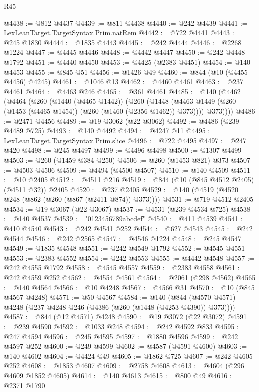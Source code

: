 \begin{lexlean}{R45}
\begin{coremodule}
{@4438 := @812 @4437
@4439 := @811 @4438
@4440 := @242 @4439
@4441 := LexLeanTarget.TargetSyntax.Prim.natRem
@4442 := @722 @4441
@4443 := @245 @1830
@4444 := @1835 @4443
@4445 := @242 @4444
@4446 := @2268 @1224
@4447 := @4445 @4446
@4448 := @4442 @4447
@4450 := @242 @4448 @1792
@4451 := @4440 @4450
@4453 := @4425 (@2383 @4451)
@4454 := @140 @4453
@4455 := @845 @51
@4456 := @1426 @49
@4460 := @844 (@10 (@4455 @4456) @4245)
@4461 := @1046 @13
@4462 := @4460 @4461
@4463 := @237 @4461
@4464 := @4463 @246
@4465 := @361 @4461
@4485 := @140
    (@4462
      (@4464
        (@260
          (@1440 (@4465 @1442))
          (@260
            (@1448 (@4463 @1449 (@260 (@1453 (@4465 @1454)) (@260 (@1460 (@2356 @1462)) @373))))
            @373))))
@4486 := @2471 @4456
@4489 := @19 @3062 (@22 @3062)
@4492 := @4486 (@239 @4489 @725)
@4493 := @140 @4492
@4494 := @4247 @11
@4495 := LexLeanTarget.TargetSyntax.Prim.slice
@4496 := @722 @4495
@4497 := @247 @420
@4498 := @245 @4497
@4499 := @4496 @4498
@4500 := @1307 @4499
@4503 := @260 (@1459 @384 @250)
@4506 := @260 (@1453 @821) @373
@4507 := @4503 @4506
@4509 := @4494 (@4500 @4507)
@4510 := @140 @4509
@4511 := @10 @2405
@4512 := @4511 @216
@4519 := @844 (@10 (@845 @4512 @2405) (@4511 @32)) @2405
@4520 := @237 @2405
@4529 := @140 (@4519 (@4520 @248 (@862 (@260 (@867 (@2411 @874)) @373))))
@4531 := @719 @4512 @2405
@4534 := @19 @3067 (@22 @3067)
@4537 := @4531 (@239 @4534 @725)
@4538 := @140 @4537
@4539 := "0123456789abcdef"
@4540 := @411 @4539
@4541 := @410 @4540
@4543 := @242 @4541 @252
@4544 := @627 @4543
@4545 := @242 @4544
@4546 := @242 @2565
@4547 := @4546 @1224
@4548 := @245 @4547
@4549 := @1835 @4548
@4551 := @242 @4549 @1792
@4552 := @4545 @4551
@4553 := @2383 @4552
@4554 := @242 @4553
@4555 := @4442 @4548
@4557 := @242 @4555 @1792
@4558 := @4545 @4557
@4559 := @2383 @4558
@4561 := @242 @4559 @252
@4562 := @4554 @4561
@4564 := @2061 (@298 @4562)
@4565 := @140 @4564
@4566 := @10 @4248
@4567 := @4566 @31
@4570 := @10 (@845 @4567 @4248)
@4571 := @50 @4567
@4584 := @140 (@844 (@4570 @4571) @4248 (@237 @4248 @246 (@4386 (@260 (@1448 (@4253 @4390)) @373))))
@4587 := @844 (@12 @4571) @4248
@4590 := @19 @3072 (@22 @3072)
@4591 := @239 @4590
@4592 := @1033 @248
@4594 := @242 @4592 @833
@4595 := @247 @4594
@4596 := @245 @4595
@4597 := @1880 @4596
@4599 := @242 @4597 @252
@4600 := @249 @4599
@4602 := @4587 (@4591 @4600)
@4603 := @140 @4602
@4604 := @4424 @49
@4605 := @1862 @725
@4607 := @242 @4605 @252
@4608 := @1853 @4607
@4609 := @2758 @4608
@4613 := @4604 (@296 @4609 @1852 @4605)
@4614 := @140 @4613
@4615 := @800 @49
@4616 := @2371 @1790
}
\end{coremodule}
\end{lexlean}
